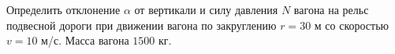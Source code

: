 Определить отклонение $\alpha$ от вертикали и силу давления $N$ вагона
на рельс подвесной дороги при движении вагона по закруглению $r = 30$ м
со скоростью $v = 10$ м/с.
Масса вагона $1500$ кг.
